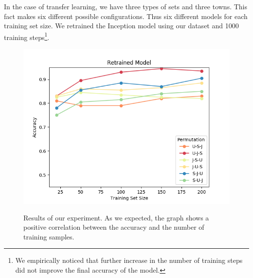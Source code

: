 In the case of transfer learning, we have three types of sets and three towns. This fact makes six different possible configurations. Thus six different models for each training set size. We retrained the Inception model using our dataset and 1000 training steps\footnote{We empirically noticed that further increase in the number of training steps did not improve the final accuracy of the model.}.\\

\begin{table}[h!]
  \caption{Permutation codes.}
\end{table}

\begin{figure}[h]
  \centering
  \includegraphics[width=1\textwidth]{images/validation-plot.png}
  \label{fig:validaton-plot}
  \caption{Results of our experiment. As we expected, the graph shows a positive correlation between the accuracy and the number of training samples.}
\end{figure}

